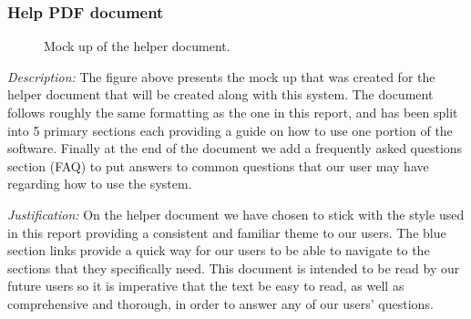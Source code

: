 \subsubsection{Help PDF document}

\begin{figure}[H]
\centering


\caption{Mock up of the helper document.}
\label{fig:help}
\end{figure}

\textit{Description:} The figure above presents the mock up
that was created for the helper document that will be
created along with this system. The document follows roughly
the same formatting as the one in this report, and has been
split into 5 primary sections each providing a guide on how
to use one portion of the software. Finally at the end of
the document we add a frequently asked questions section
(FAQ) to put answers to common questions that our user may
have regarding how to use the system.
\\ \vspace{0.2cm}

\textit{Justification:}
On the helper document we have chosen to stick with the
style used in this report providing a consistent and
familiar theme to our users. The blue section links
provide a quick way for our users to be able to navigate
to the sections that they specifically need. This document is
intended to be read by our future users so it is imperative
that the text be easy to read, as well as comprehensive and
thorough, in order to answer any of our users' questions. \\ \vspace{0.2cm}

